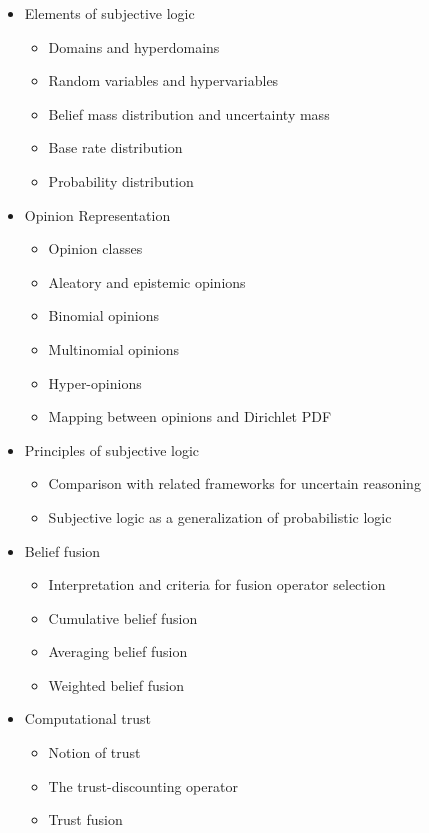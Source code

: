 \documentclass[a4paper,12pt]{article}
\theoremstyle{definition}
\theoremstyle{theorem}
\numberwithin{equation}{section}
\begin{document}
\begin{itemize}
\item Elements of subjective logic
	\begin{itemize}
	\item Domains and hyperdomains
	\item Random variables and hypervariables
	\item Belief mass distribution and uncertainty mass
	\item Base rate distribution
	\item Probability distribution
	\end{itemize}
\item Opinion Representation
	\begin{itemize}
	\item Opinion classes
	\item Aleatory and epistemic opinions
	\item Binomial opinions
	\item Multinomial opinions
	\item Hyper-opinions
	\item Mapping between opinions and Dirichlet PDF
	\end{itemize}
\item Principles of subjective logic
	\begin{itemize}
	\item Comparison with related frameworks for uncertain reasoning
	\item Subjective logic as a generalization of probabilistic logic
	\end{itemize}
\item Belief fusion
	\begin{itemize}
	\item Interpretation and criteria for fusion operator selection
	\item Cumulative belief fusion
	\item Averaging belief fusion
	\item Weighted belief fusion
	\end{itemize}
\item Computational trust
	\begin{itemize}
	\item Notion of trust
	\item The trust-discounting operator
	\item Trust fusion
	\end{itemize}
\end{itemize}
\end{document}
